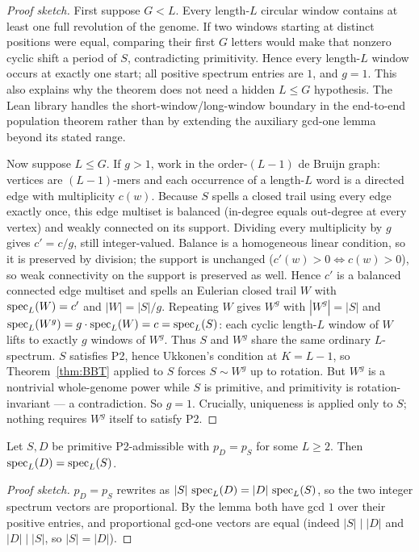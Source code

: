\begin{proof}[Proof sketch]
First suppose $G<L$. Every length-$L$ circular window contains at
least one full revolution of the genome. If two windows starting at
distinct positions were equal, comparing their first $G$ letters
would make that nonzero cyclic shift a period of $S$, contradicting
primitivity. Hence every length-$L$ window occurs at exactly one
start; all positive spectrum entries are $1$, and $g=1$.
This also explains why the theorem does not need a hidden $L\le G$
hypothesis. The Lean library handles the short-window/long-window
boundary in the end-to-end population theorem rather than by
extending the auxiliary gcd-one lemma beyond its stated range.

Now suppose $L\le G$. If $g>1$, work in the order-$(L-1)$ de Bruijn graph: vertices are
$(L-1)$-mers and each occurrence of a length-$L$ word is a directed edge
with multiplicity $c(w)$. Because $S$ spells a closed trail using every
edge exactly once, this edge multiset is balanced (in-degree equals
out-degree at every vertex) and weakly connected on its support.
Dividing every multiplicity by $g$ gives $c'=c/g$, still integer-valued.
Balance is a homogeneous linear condition, so it is preserved by division;
the support is unchanged ($c'(w)>0\iff c(w)>0$), so weak connectivity on
the support is preserved as well. Hence $c'$ is a balanced connected edge
multiset and spells an Eulerian closed trail $W$ with
$\operatorname{spec}_L(W)=c'$ and $|W|=|S|/g$.
Repeating $W$ gives $W^g$ with $|W^g|=|S|$ and
$\operatorname{spec}_L(W^g)=g\cdot\operatorname{spec}_L(W)=c=\operatorname{spec}_L(S)$: each cyclic length-$L$
window of $W$ lifts to exactly $g$ windows of $W^g$.
Thus $S$ and $W^g$ share the same ordinary $L$-spectrum.
$S$ satisfies P2, hence Ukkonen's condition at $K=L-1$, so
Theorem~\ref{thm:BBT} applied to $S$ forces $S\sim W^g$ up to rotation.
But $W^g$ is a nontrivial whole-genome power while $S$ is primitive, and
primitivity is rotation-invariant --- a contradiction. So $g=1$.
Crucially, uniqueness is applied only to $S$; nothing requires $W^g$
itself to satisfy P2.
\end{proof}

\begin{corollary}
Let $S,D$ be primitive P2-admissible with $p_D=p_S$ for some $L\ge2$.
Then $\operatorname{spec}_L(D)=\operatorname{spec}_L(S)$.
\end{corollary}

\begin{proof}[Proof sketch]
$p_D=p_S$ rewrites as $|S|\,\operatorname{spec}_L(D)=|D|\,\operatorname{spec}_L(S)$, so the two
integer spectrum vectors are proportional. By the lemma both have gcd
$1$ over their positive entries, and proportional gcd-one vectors are
equal (indeed $|S|\mid|D|$ and $|D|\mid|S|$, so $|S|=|D|$).
\end{proof}

